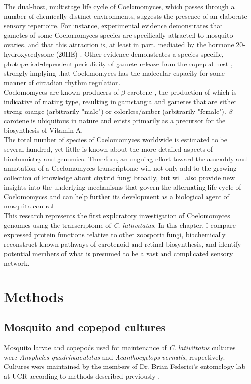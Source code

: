 \indent The dual-host, multistage life cycle of Coelomomyces, which passes through a number of chemically distinct environments, suggests the presence of an elaborate sensory repertoire. For instance, experimental evidence demonstrates that gametes of some Coelomomyces species are specifically attracted to mosquito ovaries, and that this attraction is, at least in part, mediated by the hormone 20-hydroxyecdysone (20HE) \cite{Lucarotti1992}. Other evidence demonstrates a species-specific, photoperiod-dependent periodicity of gamete release from the copepod host \cite{Federici1983}, strongly implying that Coelomomyces has the molecular capacity for some manner of circadian rhythm regulation. \\
\indent Coelomomyces are known producers of $\beta$-carotene \cite{Federici1979}, the production of which is indicative of mating type, resulting in gametangia and gametes that are either strong orange (arbitrarily "male") or colorless/amber (arbitrarily "female"). $\beta$-carotene is ubiquitous in nature and exists primarily as a precursor for the biosynthesis of Vitamin A.\\
\indent The total number of species of Coelomomyces worldwide is estimated to be several hundred, yet little is known about the more detailed aspects of biochemistry and genomics. Therefore, an ongoing effort toward the assembly and annotation of a Coelomomyces transcriptome will not only add to the growing collection of knowledge about chytrid fungi broadly, but will also provide new insights into the underlying mechanisms that govern the alternating life cycle of Coelomomyces and can help further its development as a biological agent of mosquito control. \\
\indent This research represents the first exploratory investigation of Coelomomyces genomics using the transcriptome of \textit{C. lattivitatus}. In this chapter, I compare expressed protein functions relative to other zoosporic fungi, biochemically reconstruct known pathways of carotenoid and retinal biosynthesis, and identify potential members of what is presumed to be a vast and complicated sensory network. \\

\section{Methods}
\subsection*{Mosquito and copepod cultures}
Mosquito larvae and copepods used for maintenance of \textit{C. lativittatus} cultures were \textit{Anopheles quadrimaculatus} and \textit{Acanthocyclops vernalis}, respectively. Cultures were maintained by the members of Dr. Brian Federici's entomology lab at UCR according to methods described previously \cite{Federici1983}.\\ 
